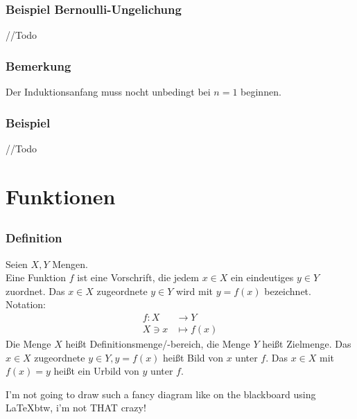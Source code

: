\documentclass{article}
\begin{document}
    \subsubsection{Beispiel Bernoulli-Ungelichung}
      //Todo

    \subsubsection{Bemerkung}
      Der Induktionsanfang muss nocht unbedingt bei $n=1$ beginnen.

    \subsubsection{Beispiel}
      //Todo

\section{Funktionen}
  \subsection{}
    \subsubsection{Definition}
      Seien $X,Y$ Mengen. \\
      Eine Funktion $f$ ist eine Vorschrift, die jedem $x \in X$ ein eindeutiges
      $y \in Y$ zuordnet. Das $x \in X$ zugeordnete $y \in Y$ wird mit
      $y=f(x)$ bezeichnet. \\
      Notation:
      \begin{align*}
        f: X &\to Y \\
        X \ni x &\mapsto f(x)
      \end{align*}
      Die Menge $X$ heißt Definitionsmenge/-bereich, die Menge $Y$ heißt
      Zielmenge. Das $x \in X$ zugeordnete $y \in Y, y=f(x)$ heißt Bild von $x$
      unter $f$. Das $x \in X$ mit $f(x)=y$ heißt ein Urbild von $y$ unter $f$.

      I'm not going to draw such a fancy diagram like on the blackboard using
      \LaTeX btw, i'm not THAT crazy!
\end{document}
